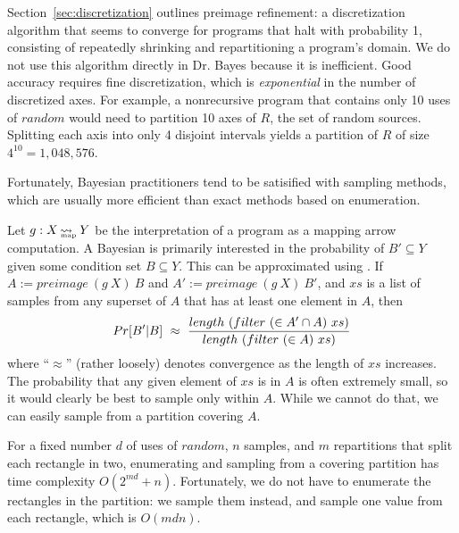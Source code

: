 \documentclass{llncs}
\newcommand{\arrow}{\rightsquigarrow}
\newcommand{\map}{_\mathrm{map}}
\DeclareMathOperator{\mapto}{\arrow_{\mspace{-21mu}\map}}
\begin{document}
Section~\ref{sec:discretization} outlines preimage refinement: a discretization algorithm that seems to converge for programs that halt with probability 1, consisting of repeatedly shrinking and repartitioning a program's domain.
We do not use this algorithm directly in Dr. Bayes because it is inefficient.
Good accuracy requires fine discretization, which is \emph{exponential} in the number of discretized axes.
For example, a nonrecursive program that contains only 10 uses of $random$ would need to partition 10 axes of $R$, the set of random sources.
Splitting each axis into only 4 disjoint intervals yields a partition of $R$ of size $4^{10} = 1,048,576$.

Fortunately, Bayesian practitioners tend to be satisified with sampling methods, which are usually more efficient than exact methods based on enumeration.

Let $g : X \mapto Y$ be the interpretation of a program as a mapping arrow computation.
A Bayesian is primarily interested in the probability of $B' \subseteq Y$ given some condition set $B \subseteq Y$.
This can be approximated using .
If $A := preimage~(g~X)~B$ and $A' := preimage~(g~X)~B'$, and $xs$ is a list of samples from any superset of $A$ that has at least one element in $A$, then
\begin{equation}
	Pr[B'|B] \ \approx \ \frac{length~(filter~(\in A' \i A)~xs)}{length~(filter~(\in A)~xs)}
\label{eqn:sampling-approx-conditional}
\end{equation}
where ``$\approx$'' (rather loosely) denotes convergence as the length of $xs$ increases.
The probability that any given element of $xs$ is in $A$ is often extremely small, so it would clearly be best to sample only within $A$.
While we cannot do that, we can easily sample from a partition covering $A$.

For a fixed number $\mathit{d}$ of uses of $random$, $\mathit{n}$ samples, and $\mathit{m}$ repartitions that split each rectangle in two, enumerating and sampling from a covering partition has time complexity $\mathit{O}(2^\mathit{md} + \mathit{n})$.
Fortunately, we do not have to enumerate the rectangles in the partition: we sample them instead, and sample one value from each rectangle, which is $\mathit{O(mdn)}$.
\end{document}
